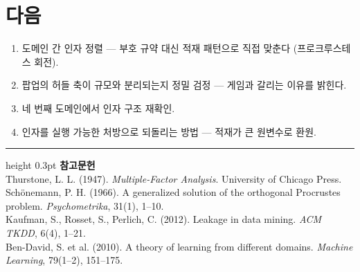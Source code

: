 \documentclass[10pt]{article}
\begin{document}
\section{다음}

\begin{enumerate}[leftmargin=1.3em,itemsep=0.15em]
\item 도메인 간 인자 정렬 --- 부호 규약 대신 적재 패턴으로 직접 맞춘다
      (프로크루스테스 회전).
\item 팝업의 허들 축이 규모와 분리되는지 정밀 검정 --- 게임과 갈리는 이유를 밝힌다.
\item 네 번째 도메인에서 인자 구조 재확인.
\item 인자를 실행 가능한 처방으로 되돌리는 방법 --- 적재가 큰 원변수로 환원.
\end{enumerate}

\vspace{0.6em}
\hrule height 0.3pt
\vspace{0.5em}
{\footnotesize
\textbf{참고문헌}\\[0.3em]
Thurstone, L. L. (1947). \emph{Multiple-Factor Analysis}. University of Chicago Press.\\[0.15em]
Schönemann, P. H. (1966). A generalized solution of the orthogonal Procrustes
problem. \emph{Psychometrika}, 31(1), 1--10.\\[0.15em]
Kaufman, S., Rosset, S., Perlich, C. (2012). Leakage in data mining.
\emph{ACM TKDD}, 6(4), 1--21.\\[0.15em]
Ben-David, S. et al. (2010). A theory of learning from different domains.
\emph{Machine Learning}, 79(1--2), 151--175.
}
\end{document}
